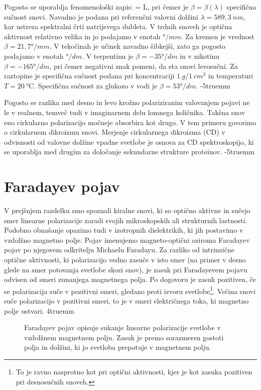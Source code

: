 Pogosto se uporablja fenomenološki zapis:
\beq
\Delta \varphi = \beta L,
\label{eq:09_50}
\eeq
pri čemer je $\beta = \beta (\lambda)$ specifična sučnost snovi. Navadno je podana pri referenčni
valovni dolžini $\lambda = 589,3~\si{nm}$, kar ustreza spektralni črti natrijevega dubleta. V
trdnih snoveh je optična aktivnost relativno velika in jo podajamo v enotah $\si{\degree}/\si{mm}$. Za 
kremen je vrednost $\beta = 21,7\si{\degree}/\si{mm}$. V tekočinah je učinek
navadno šibkejši, zato ga pogosto podajamo v enotah $\si{\degree}/\si{dm}$. V terpentinu
je $\beta = -35\si{\degree}/\si{dm}$ in v nikotinu $\beta = -165\si{\degree}/\si{dm}$,
pri čemer negativni znak pomeni, da sta snovi levosučni. Za raztopine je specifična sučnost
podana pri koncentraciji $1~\si{g}/1~\si{cm}^3$ in temperaturi $T = 20~\si{\celsius}$. 
Specifična sučnost za glukozo v vodi je $\beta = 53\si{\degree}/\si{dm}$.
\vglue-5truemm
\begin{remark}
Pogosto se razlika med desno in levo krožno polariziranim valovanjem pojavi ne le v realnem, 
temveč tudi v imaginarnem delu lomnega količnika. Takšna snov eno cirkularno polarizacijo močneje
absorbira kot drugo. V tem primeru govorimo o cirkularnem dikroizmu snovi. Merjenje cirkularnega
dikroizma (CD) v odvisnosti od valovne dolžine vpadne svetlobe je osnova za CD spektroskopijo, ki
se uporablja med drugim za določanje sekundarne strukture proteinov. 
\vglue-5truemm
\end{remark}

\section{Faradayev pojav}
V prejšnjem razdelku smo spoznali kiralne snovi, ki so optično aktivne in sučejo smer
linearne polarizacije zaradi svojih mikroskopskih ali strukturnih lastnosti. 
Podobno obnašanje opazimo tudi v izotropnih dielektrikih, ki jih postavimo v vzdolžno
magnetno polje. Pojav imenujemo magneto-optični oziroma Faradayev pojav
po njegovem odkritelju Michaelu Faradayu. Za razliko 
od intrinzične optične aktivnosti, ki polarizacijo vedno zasuče v isto smer (na primer
v desno glede na smer potovanja svetlobe skozi snov), je zasuk pri Faradayevem pojavu 
odvisen od smeri zunanjega 
magnetnega polja. Po dogovoru je zasuk pozitiven, če se polarizacija suče v 
pozitivni smeri, gledano proti izvoru svetlobe\footnote{To je ravno nasprotno kot
pri optični aktivnosti, kjer je kot zasuka pozitiven pri desnosučnih snoveh.}.
Večina snovi suče polarizacijo v pozitivni smeri, to je v smeri električnega toka, ki
magnetno polje ustvari. 
\vglue4truemm
\begin{figure}[h]
\centering
\def\svgwidth{120truemm} 

\caption{Faradayev pojav opisuje sukanje linearne polarizacije svetlobe v vzdolžnem mag\-net\-nem
polju. Zasuk je premo sorazmeren gostoti polja in dolžini, ki jo svetloba prepotuje
v magnetnem polju.}
\label{fig:09_Faraday}
\end{figure}

